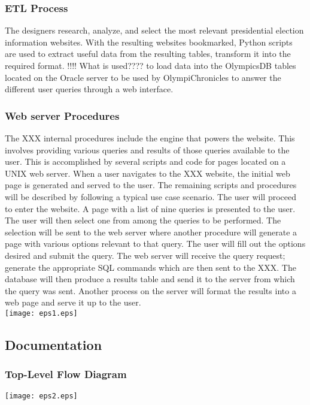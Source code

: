 \documentclass{article}
\begin{document}
\subsubsection{ETL Process}
The designers research, analyze, and select the most relevant presidential election information websites. With the resulting websites bookmarked, Python scripts are used to extract useful data from the resulting tables, transform it into the required format. !!!! What is used???? to load data into the OlympicsDB tables located on the Oracle server to be used by OlympiChronicles to answer the different user queries through a web interface.
\subsubsection{Web server Procedures}
The XXX internal procedures include the engine that powers the website. This involves providing various queries and results of those queries available to the user. This is accomplished by several scripts and code for pages located on a UNIX web server. When a user navigates to the XXX website, the initial web page is generated and served to the user. The remaining scripts and procedures will be described by following a typical use case scenario. The user will proceed to enter the website. A page with a list of nine queries is presented to the user. The user will then select one from among the queries to be performed. The selection will be sent to the web server where another procedure will generate a page with various options relevant to that query. The user will fill out the options desired and submit the query. The web server will receive the query request; generate the appropriate SQL commands which are then sent to the XXX. The database will then produce a results table and send it to the server from which the query was sent. Another process on the server will format the results into a web page and serve it up to the user.\\
\texttt{[image: eps1.eps]}


\subsection{Documentation}


\subsubsection{Top-Level Flow Diagram}
\texttt{[image: eps2.eps]}
\end{document}
